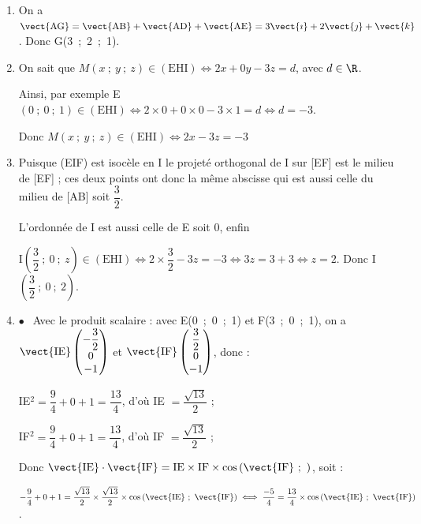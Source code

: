 \begin{enumerate}
\item %
On a $\vect{\text{AG}} = \vect{\text{AB}} + \vect{\text{AD}} + \vect{\text{AE}} = 3\vect{\imath} + 2\vect{\jmath} + \vect{k}$. Donc G(3~;~2~;~1).
\item %

On sait que $M(x~;~y~;~z) \in (\text{EHI}) \iff 2x + 0y - 3z = d$, avec $d \in \R$.

Ainsi, par exemple  E$(0~;~0~;~1) \in (\text{EHI}) \iff 2\times 0 + 0\times 0 - 3\times 1 = d \iff d = -3$.

Donc $M(x~;~y~;~z) \in (\text{EHI}) \iff 2x  - 3z = -3$
\item %
Puisque (EIF) est isocèle en I le projeté orthogonal de I sur [EF] est le milieu de [EF] ; ces deux points ont donc la même abscisse qui est aussi celle du milieu de [AB] soit $\dfrac32$.

L'ordonnée de I est aussi celle de E soit $0$, enfin 

I$\left(\dfrac32~;~0~;~z\right) \in (\text{EHI}) \iff 2 \times \dfrac32  - 3z = - 3\iff 3z = 3 + 3 \iff z = 2$. Donc I$\left(\dfrac32~;~0~;~2\right)$.
\item %
$\bullet~~$ Avec le produit scalaire : avec E(0~;~0~;~1) et F(3~;~0~;~1), on a $\vect{\text{IE}}\begin{pmatrix}-\dfrac32\\0\\- 1\end{pmatrix}$ et $\vect{\text{IF}}\begin{pmatrix}\dfrac32\\0\\- 1\end{pmatrix}$, donc :

IE$^2 = \dfrac94 + 0 + 1 = \dfrac{13}{4}$, d'où IE $ = \dfrac{\sqrt{13}}{2}$ ;

IF$^2 = \dfrac94 + 0 + 1 = \dfrac{13}{4}$, d'où IF $ = \dfrac{\sqrt{13}}{2}$ ;

Donc $\vect{\text{IE}} \cdot \vect{\text{IF}} = \text{IE} \times \text{IF} \times \cos \left(\vect{\text{IF}}~;~ \right)$, soit :

$- \dfrac94 + 0 + 1 = \dfrac{\sqrt{13}}{2} \times \dfrac{\sqrt{13}}{2} \times \cos \left(\vect{\text{IE}}~;~ \vect{\text{IF}}\right) \iff \dfrac{-5}{4} = \dfrac{13}{4}\times \cos \left(\vect{\text{IE}}~;~ \vect{\text{IF}}\right) $.


\end{enumerate}
